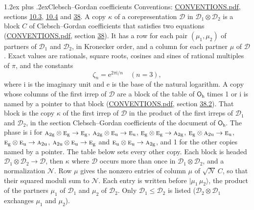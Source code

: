 \documentclass[10pt,a4paper]{article}
\makeatletter
\renewcommand\section{\@startsection{section}{1}{\z@}{-3ex plus -1ex minus -.2ex}%
  {1.2ex plus .2ex}{\normalfont\large\sffamily\bfseries\color{parttitle}}}
\numberwithin{equation}{section}
\newcommand{\grp}[1]{\mathsf{#1}}
\newcommand{\irr}[1]{\text{\normalfont\scshape #1}}
\newcommand{\ptag}[1]{\mathrm{#1}}
\newcommand{\iunit}{\mathrm{i}}
\newcommand{\expe}{\mathrm{e}}
\newcommand{\rootunity}[1]{\zeta_{#1}}
\newcommand{\irrprod}{\otimes}
\newcommand{\mult}{\kappa}
\newcommand{\intx}{\mu}
\newcommand{\cgnorm}{\mathcal{N}}
\newcommand{\prodket}[2]{\lvert {#1}\,{#2}\rangle}
\makeatother
\begin{document}
\section{Clebsch--Gordan coefficients}\label{s:clebsch_gordan}
Conventions: \href{../../CONVENTIONS.pdf}{CONVENTIONS.pdf}, sections \href{../../../rotation/CONVENTIONS.pdf\#conv.10.3}{10.3}, \href{../../../rotation/CONVENTIONS.pdf\#conv.10.4}{10.4} and \href{../../CONVENTIONS.pdf\#conv.38}{38}.
\leavevmode\label{n:index.copy}\label{n:matrix.cg.stored}A copy $\mult$ of a corepresentation $\mathcal{D}$ in $\mathcal{D}_1\irrprod\mathcal{D}_2$ is a block $C$ of Clebsch--Gordan coefficients that satisfies two equations (\href{../../CONVENTIONS.pdf}{CONVENTIONS.pdf}, section \href{../../CONVENTIONS.pdf\#conv.38}{38}). \label{n:index.cg}It has a row for each pair $(\intx_1, \intx_2)$ of partners of $\mathcal{D}_1$ and $\mathcal{D}_2$, in Kronecker order, and a column for each partner $\intx$ of $\mathcal{D}$.
\leavevmode\label{n:constant.root}\label{n:index.root.order}Exact values are rationals, square roots, cosines and sines of rational multiples of $\pi$, and the constants
\begin{equation}\label{e:constants}\rootunity{n} = \expe^{2\pi\iunit/n}\quad(n = 3),\end{equation}
where $\iunit$ is the imaginary unit and $\expe$ is the base of the natural logarithm.
A copy whose columns of the first irrep of $\mathcal{D}$ are a block of the table of $\grp{O_{h}}$ times 1 or $\iunit$ is named by a pointer to that block (\href{../../CONVENTIONS.pdf}{CONVENTIONS.pdf}, section \href{../../CONVENTIONS.pdf\#conv.38.2}{38.2}). That block is the copy $\mult$ of the first irrep of $\mathcal{D}$ in the product of the first irreps of $\mathcal{D}_1$ and $\mathcal{D}_2$, in the section Clebsch--Gordan coefficients of the document of \href{../../../rotation/data/pdf/Oh.pdf}{$\grp{O_{h}}$}. The phase is $\iunit$ for $\irr{a}_{2\ptag{g}}\irrprod \irr{e}_{\ptag{g}}\to \irr{e}_{\ptag{g}}$, $\irr{a}_{2\ptag{g}}\irrprod \irr{e}_{\ptag{u}}\to \irr{e}_{\ptag{u}}$, $\irr{e}_{\ptag{g}}\irrprod \irr{e}_{\ptag{g}}\to \irr{a}_{2\ptag{g}}$, $\irr{e}_{\ptag{g}}\irrprod \irr{a}_{2\ptag{u}}\to \irr{e}_{\ptag{u}}$, $\irr{e}_{\ptag{g}}\irrprod \irr{e}_{\ptag{u}}\to \irr{a}_{2\ptag{u}}$, $\irr{a}_{2\ptag{u}}\irrprod \irr{e}_{\ptag{u}}\to \irr{e}_{\ptag{g}}$ and $\irr{e}_{\ptag{u}}\irrprod \irr{e}_{\ptag{u}}\to \irr{a}_{2\ptag{g}}$, and 1 for the other copies named by a pointer. The table below sets every other copy.
Each block is headed $\mathcal{D}_1\irrprod\mathcal{D}_2\to\mathcal{D}$, then $\mult$ where $\mathcal{D}$ occurs more than once in $\mathcal{D}_1\irrprod\mathcal{D}_2$, and a normalization $\cgnorm$. Row $\intx$ gives the nonzero entries of column $\intx$ of $\sqrt{\cgnorm}\,C$, so that their squared moduli sum to $\cgnorm$. \label{n:vector.ket.product}Each entry is written before $\prodket{\intx_1}{\intx_2}$, the product of the partners $\intx_1$ of $\mathcal{D}_1$ and $\intx_2$ of $\mathcal{D}_2$. Only $\mathcal{D}_1 \le \mathcal{D}_2$ is listed ($\mathcal{D}_2\irrprod\mathcal{D}_1$ exchanges $\intx_1$ and $\intx_2$).
\end{document}
